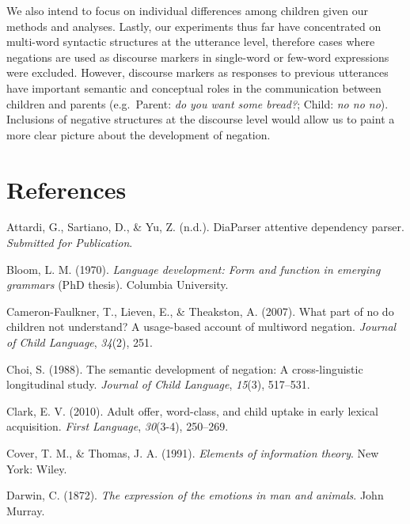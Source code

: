 \documentclass[10pt, letterpaper]{article}
\begin{document}
We also intend to focus on individual differences among children given
our methods and analyses. Lastly, our experiments thus far have
concentrated on multi-word syntactic structures at the utterance level,
therefore cases where negations are used as discourse markers in
single-word or few-word expressions were excluded. However, discourse
markers as responses to previous utterances have important semantic and
conceptual roles in the communication between children and parents
(e.g.~Parent: \emph{do you want some bread?}; Child: \emph{no no no}).
Inclusions of negative structures at the discourse level would allow us
to paint a more clear picture about the development of negation.

\hypertarget{references}{%
\section{References}\label{references}}

\setlength{\parindent}{-0.1in} 
\setlength{\leftskip}{0.125in}

\noindent

\hypertarget{refs}{}
\leavevmode\hypertarget{ref-diaparser}{}%
Attardi, G., Sartiano, D., \& Yu, Z. (n.d.). DiaParser attentive
dependency parser. \emph{Submitted for Publication}.

\leavevmode\hypertarget{ref-bloom1970language}{}%
Bloom, L. M. (1970). \emph{Language development: Form and function in
emerging grammars} (PhD thesis). Columbia University.

\leavevmode\hypertarget{ref-cameron2007part}{}%
Cameron-Faulkner, T., Lieven, E., \& Theakston, A. (2007). What part of
no do children not understand? A usage-based account of multiword
negation. \emph{Journal of Child Language}, \emph{34}(2), 251.

\leavevmode\hypertarget{ref-choi1988semantic}{}%
Choi, S. (1988). The semantic development of negation: A
cross-linguistic longitudinal study. \emph{Journal of Child Language},
\emph{15}(3), 517--531.

\leavevmode\hypertarget{ref-clark2010adult}{}%
Clark, E. V. (2010). Adult offer, word-class, and child uptake in early
lexical acquisition. \emph{First Language}, \emph{30}(3-4), 250--269.

\leavevmode\hypertarget{ref-cover_elements_1991}{}%
Cover, T. M., \& Thomas, J. A. (1991). \emph{Elements of information
theory}. New York: Wiley.

\leavevmode\hypertarget{ref-darwin1872expression}{}%
Darwin, C. (1872). \emph{The expression of the emotions in man and
animals}. John Murray.
\end{document}

